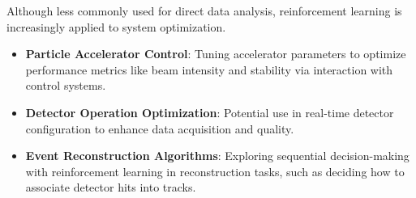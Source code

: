 \documentclass[letterpaper,12pt]{article}
\begin{document}
\begin{spacing}{1.125}
Although less commonly used for direct data analysis, reinforcement learning is increasingly applied to system optimization.

\begin{itemize}
    \item \textbf{Particle Accelerator Control}: Tuning accelerator parameters to optimize performance metrics like beam intensity and stability via interaction with control systems.
    
    \item \textbf{Detector Operation Optimization}: Potential use in real-time detector configuration to enhance data acquisition and quality.
    
    \item \textbf{Event Reconstruction Algorithms}: Exploring sequential decision-making with reinforcement learning in reconstruction tasks, such as deciding how to associate detector hits into tracks.
\end{itemize}



\end{spacing}
\end{document}

